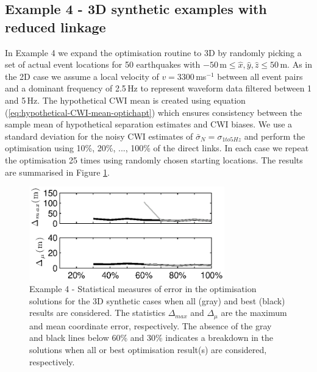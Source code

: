 \documentclass[extra, onecolumn, doublespacing]{gji}
\begin{document}
\subsection{Example 4 - 3D synthetic examples with reduced linkage}

In Example 4 we expand the optimisation routine to 3D by randomly picking
 a set of actual event locations for 50 earthquakes with
$-50$\,m$\leq \hat{x},\hat{y},\hat{z} \leq 50$\,m. As in the 2D case we assume a local velocity
of $v=3300\,$ms$^{-1}$ between all event pairs and a dominant frequency of 2.5$\,$Hz to represent
 waveform data filtered between 1 and 5$\,$Hz.
The hypothetical CWI mean is created using equation (\ref{eq:hypothetical-CWI-mean-optichapt})
which ensures consistency between the sample mean of hypothetical separation estimates and CWI
biases. We use a standard deviation for the noisy CWI estimates
of $\bar{\sigma}_N = \sigma_{1to5Hz}$ and perform the optimisation using 10\%,
20\%, ..., 100\% of the direct links.
In each case we repeat the
optimisation 25 times using randomly chosen starting locations. The results are
summarised in Figure \ref{fig:optimisationresults-3Dsynth}.

\begin{figure}
\noindent\includegraphics[width =
20pc]{diags/synth3Dmulti/ressummary_3Dsynth50eq.eps}
\caption{Example 4 - Statistical measures of error in the
optimisation solutions for the 3D synthetic cases when all (gray)
and best (black) results are considered. The statistics
$\Delta_{max}$ and $\Delta_\mu$ are the maximum and mean coordinate
error, respectively. The absence of the gray and black lines below
60\% and 30\% indicates a breakdown in the solutions when all or
best optimisation result(s) are considered, respectively.}
\label{fig:optimisationresults-3Dsynth}
\end{figure}
\end{document}
